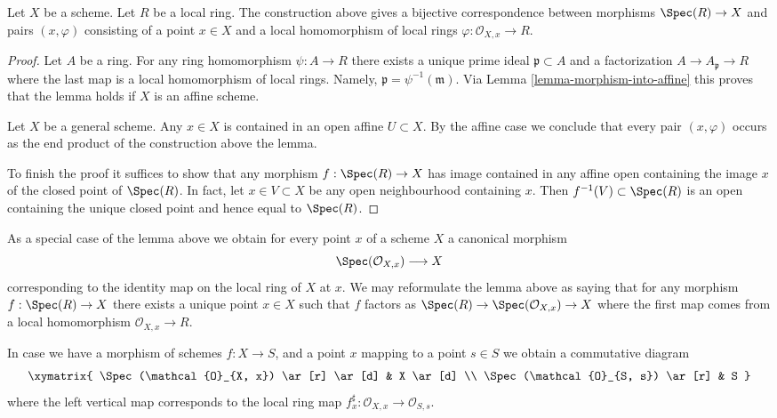 \begin{lemma}
\label{lemma-morphism-from-spec-local-ring}
Let $X$ be a scheme. Let $R$ be a local ring.
The construction above gives a bijective correspondence
between morphisms $\Spec(R) \to X$ and pairs
$(x, \varphi)$ consisting of a point $x \in X$ and
a local homomorphism of local rings $\varphi : \mathcal{O}_{X, x} \to R$.
\end{lemma}

\begin{proof}
Let $A$ be a ring. For any ring homomorphism $\psi : A \to R$
there exists a unique prime ideal $\mathfrak p \subset A$
and a factorization $A \to A_{\mathfrak p} \to R$ where the
last map is a local homomorphism of local rings. Namely,
$\mathfrak p = \psi^{-1}(\mathfrak m)$. Via
Lemma \ref{lemma-morphism-into-affine}
this proves that the lemma holds if $X$ is an affine scheme.

\medskip\noindent
Let $X$ be a general scheme. Any $x \in X$ is contained in
an open affine $U \subset X$. By the affine case we conclude that every pair
$(x, \varphi)$ occurs as the end product of the construction
above the lemma.

\medskip\noindent
To finish the proof it suffices to show that any morphism
$f : \Spec(R) \to X$ has image contained in any affine
open containing the image $x$ of the closed
point of $\Spec(R)$. In fact, let $x \in V \subset X$
be any open neighbourhood containing $x$. Then
$f^{-1}(V) \subset \Spec(R)$ is an open containing
the unique closed point and hence equal to $\Spec(R)$.
\end{proof}

\noindent
As a special case of the lemma above we obtain for every
point $x$ of a scheme $X$ a canonical morphism
\begin{equation}
\label{equation-canonical-morphism}
\Spec(\mathcal{O}_{X, x}) \longrightarrow X
\end{equation}
corresponding to the identity map on the local ring of $X$ at $x$.
We may reformulate the lemma above as saying that for any
morphism $f : \Spec(R) \to X$ there exists a unique point
$x \in X$ such that $f$ factors as
$\Spec(R) \to \Spec(\mathcal{O}_{X, x}) \to X$
where the first map comes from a local homomorphism
$\mathcal{O}_{X, x} \to R$.

\medskip\noindent
In case we have a morphism of schemes $f : X \to S$,
and a point $x$ mapping to a point $s \in S$ we obtain
a commutative diagram
$$
\xymatrix{
\Spec(\mathcal{O}_{X, x}) \ar[r] \ar[d] & X \ar[d] \\
\Spec(\mathcal{O}_{S, s}) \ar[r] & S
}
$$
where the left vertical map corresponds to the local ring map
$f^\sharp_x : \mathcal{O}_{X, x} \to \mathcal{O}_{S, s}$.

